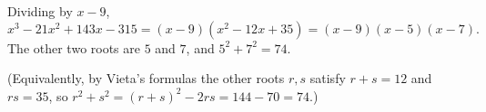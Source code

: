 Dividing by $x-9$,
\[x^3-21x^2+143x-315=(x-9)\left(x^2-12x+35\right)=(x-9)(x-5)(x-7).\]
The other two roots are $5$ and $7$, and $5^2+7^2=\boxed{74}$.

(Equivalently, by Vieta's formulas the other roots $r,s$ satisfy $r+s=12$ and $rs=35$, so $r^2+s^2=(r+s)^2-2rs=144-70=74$.)
